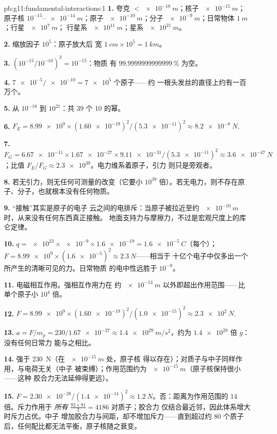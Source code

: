 \begin{solution}{pb:g11:fundamental-interactions:1}
\textbf{1.} 夸克 $< \qty{e-18}{m}$；核子 $\qty{e-15}{m}$；原子核
$10^{-15}$--$\qty{e-14}{m}$；原子 $\qty{e-10}{m}$；分子
$\qty{e-9}{m}$；日常物体 $\qty{1}{m}$；行星 $\qty{e7}{m}$；
行星系 $\qty{e11}{m}$；星系 $\qty{e21}{m}$。

\textbf{2.} 缩放因子 $10^{5}$：原子放大后
宽 $\qty{1}{cm} \times 10^{5} = \qty{1}{km}$。

\textbf{3.} $(10^{-15}/10^{-10})^3 = 10^{-15}$：物质
有 $\num{99.9999999999999}\,\%$ 为空。

\textbf{4.} $\num{7e-5}/\num{e-10} = \num{7e5}$ 个原子——约
一根头发丝的直径上约有一百万个。

\textbf{5.} 从 $10^{-18}$ 到 $10^{21}$：共 $39$ 个 10 的幂。

\textbf{6.} $F_E = \num{8.99e9} \times (\num{1.60e-19})^2 /
(\num{5.3e-11})^2 \approx \qty{8.2e-8}{N}$.

\textbf{7.} $F_G = \num{6.67e-11} \times \num{1.67e-27} \times
\num{9.11e-31}/(\num{5.3e-11})^2 \approx \qty{3.6e-47}{N}$；比值
$F_E/F_G \approx \num{2.3e39}$。电力维系着原子，引力
则只是旁观者。

\textbf{8.} 若无引力，则无任何可测量的改变（它要小 $10^{39}$
倍）。若无电力，则不存在原子、分子，也就根本没有任何物质。

\textbf{9.} “接触”其实是原子的电子
云之间的电排斥：当原子被拉近至约 $\qty{e-10}{m}$ 时，从来没有任何东西真正接触。
地面支持力与摩擦力，不过是宏观尺度上的库仑定律。

\textbf{10.} $q = \num{e23} \times \num{e-9} \times \num{1.6e-19} =
\qty{1.6e-5}{C}$（每个）；
$F = \num{8.99e9} \times (\num{1.6e-5})^2 \approx \qty{2.3}{N}$——相当于
十亿个电子中仅多出一个所产生的清晰可见的力。日常物质
的电中性远胜于 $10^{-9}$。

\textbf{11.} 电磁相互作用。强相互作用力在
约 $\qty{e-14}{m}$ 以外即超出作用范围——比
单个原子小 $10^{4}$ 倍。

\textbf{12.} $F = \num{8.99e9} \times (\num{1.60e-19})^2 /
(\num{1.0e-15})^2 \approx \qty{2.3e2}{N}$.

\textbf{13.} $a = F/m_p = 230/\num{1.67e-27} \approx
\qty{1.4e29}{m/s^2}$，约为 $\num{1.4e28}$ 倍 $g$：没有任何日常力
能与之相比。

\textbf{14.} 强于 \qty{230}{N}（在 $\qty{e-15}{m}$ 处，原子核
得以存在）；对质子与中子同样作用，与电荷无关（中子
被束缚）；作用范围约为 $\qty{e-15}{m}$（原子核保持很小——这种
胶合力无法延伸得更远）。

\textbf{15.} $F = \num{2.30e-28}/(\num{1.4e-14})^2 \approx
\qty{1.2}{N}$。否：距离为作用范围的 $14$ 倍。斥力作用于
\emph{所有} $\frac{92\times91}{2} = 4186$ 对质子；胶合力
仅结合最近邻，因此体系增大时斥力占优。中子
增加胶合力与间距，却不增加斥力——直到超过约 $80$
个质子后，任何配比都无法平衡，原子核随之衰变。


\end{solution}
